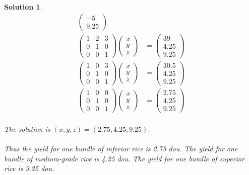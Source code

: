 \documentclass{article}
\newtheorem*{solution}{Solution}
\begin{document}
\begin{solution}
\begin{align*}
\begin{pmatrix}
-5 \\
9.25
\end{pmatrix}
\\
\begin{pmatrix}
1 & 2 & 3 \\
0 & 1 & 0 \\
0 & 0 & 1
\end{pmatrix}
\begin{pmatrix}
x \\ 
y \\
z
\end{pmatrix}
&=
\begin{pmatrix}
39 \\
4.25 \\
9.25
\end{pmatrix}
\\
\begin{pmatrix}
1 & 0 & 3 \\
0 & 1 & 0 \\
0 & 0 & 1
\end{pmatrix}
\begin{pmatrix}
x \\ 
y \\
z
\end{pmatrix}
&=
\begin{pmatrix}
30.5 \\
4.25 \\
9.25
\end{pmatrix}
\\
\begin{pmatrix}
1 & 0 & 0 \\
0 & 1 & 0 \\
0 & 0 & 1
\end{pmatrix}
\begin{pmatrix}
x \\ 
y \\
z
\end{pmatrix}
&=
\begin{pmatrix}
2.75 \\
4.25 \\
9.25
\end{pmatrix}
\end{align*} 
\\
The solution is $(x, y, z) = (2.75, 4.25, 9.25)$. \\ \\
Thus the yield for one bundle of inferior rice is 2.75 dou. The yield for one bundle of medium-grade rice is 4.25 dou. The yield for one bundle of superior rice is 9.25 dou.

\end{solution}
\end{document}
